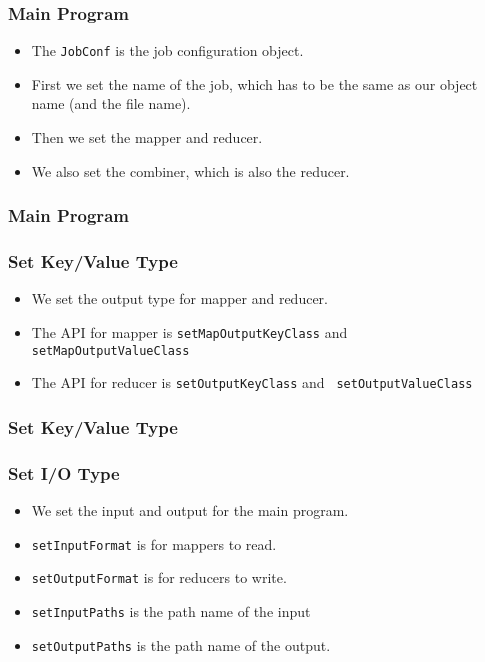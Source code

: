 \documentclass{beamer}
\begin{document}
\begin{frame}
  \frametitle{Main Program}
  \begin{itemize}
    \item The {\tt JobConf} is the job configuration object.
    \item First we set the name of the job, which has to be the same
      as our object name (and the file name).
    \item Then we set the mapper and reducer. 
    \item We also set the combiner, which is also the reducer.
  \end{itemize}
\end{frame}

\begin{frame}
  \frametitle{Main Program}
\end{frame}

\begin{frame}
  \frametitle{Set Key/Value Type}
  \begin{itemize}
    \item We set the output type for mapper and reducer.
    \item The API for mapper is {\tt setMapOutputKeyClass} and {\tt
      setMapOutputValueClass}
    \item The API for reducer is {\tt setOutputKeyClass} and {\tt
      setOutputValueClass}
  \end{itemize}
\end{frame}


\begin{frame}
  \frametitle{Set Key/Value Type}
\end{frame}

\begin{frame}
  \frametitle{Set I/O Type}
  \begin{itemize}
    \item We set the input and output for the main program.
    \item {\tt setInputFormat} is for mappers to read.
    \item {\tt setOutputFormat} is for reducers to write.
    \item {\tt setInputPaths} is the path name of the input
    \item {\tt setOutputPaths} is the path name of the output.
  \end{itemize}
\end{frame}
\end{document}
